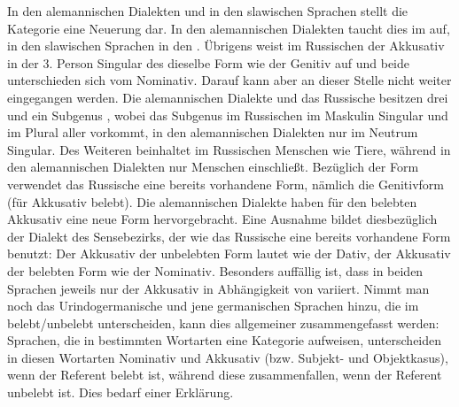 In den alemannischen Dialekten und in den slawischen Sprachen stellt die Kategorie  eine Neuerung dar. In den alemannischen Dialekten taucht dies im  auf, in den slawischen Sprachen in den . Übrigens weist im Russischen der Akkusativ in der 3. Person Singular des  dieselbe Form wie der Genitiv auf und beide  unterschieden sich vom Nominativ. Darauf kann aber an dieser Stelle nicht weiter eingegangen werden. Die alemannischen Dialekte und das Russische besitzen drei  und ein Subgenus , wobei das Subgenus im Russischen im Maskulin Singular und im Plural aller  vorkommt, in den alemannischen Dialekten nur im Neutrum Singular. Des Weiteren beinhaltet  im Russischen Menschen wie Tiere, während  in den alemannischen Dialekten nur Menschen einschließt. Bezüglich der Form verwendet das Russische eine bereits vorhandene Form, nämlich die Genitivform (für Akkusativ belebt). Die alemannischen Dialekte haben für den belebten Akkusativ eine neue Form hervorgebracht. Eine Ausnahme bildet diesbezüglich der Dialekt des Sensebezirks, der wie das Russische eine bereits vorhandene Form benutzt: Der Akkusativ der unbelebten Form lautet wie der Dativ, der Akkusativ der belebten Form wie der Nominativ. Besonders auffällig ist, dass in beiden Sprachen jeweils nur der Akkusativ in Abhängigkeit von  variiert. Nimmt man noch das Urindogermanische und jene germanischen Sprachen hinzu, die im  be\-lebt/un\-be\-lebt unterscheiden, kann dies allgemeiner zusammengefasst werden: Sprachen, die in bestimmten Wortarten eine Kategorie  aufweisen, unterscheiden in diesen Wortarten Nominativ und Akkusativ (bzw. Subjekt- und Objektkasus), wenn der Referent belebt ist, während diese  zusammenfallen, wenn der Referent unbelebt ist. Dies bedarf einer Erklärung.

